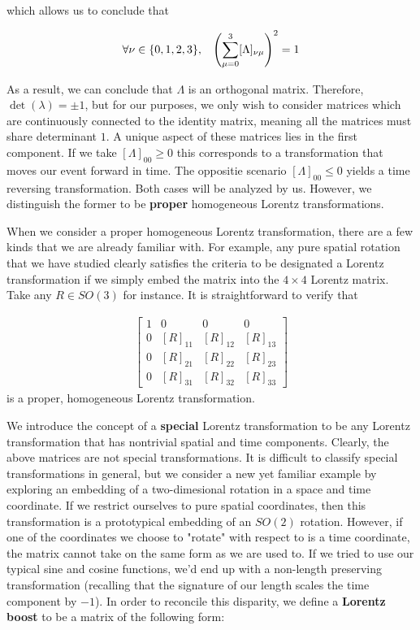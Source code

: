 \documentclass[10pt]{ucthesis}
\begin{document}
which allows us to conclude that 

\begin{equation}
\begin{aligned}
	\forall \nu \in \{0,1,2,3\},\hspace{3mm} \left(\sum_{\mu=0}^3[\Lambda]_{\nu\mu}\right)^2 = 1
\end{aligned}
\end{equation}

As a result, we can conclude that $\Lambda$ is an orthogonal matrix. Therefore, $\det(\lambda) = \pm 1$, but for our purposes, we only wish to consider matrices which are continuously connected to the identity matrix, meaning all the matrices must share determinant $1$. A unique aspect of these matrices lies in the first component. If we take $[\Lambda]_{00}\geq 0$ this corresponds to a transformation that moves our event forward in time. The oppositie scenario $[\Lambda]_{00}\leq 0$ yields a time reversing transformation. Both cases will be analyzed by us. However, we distinguish the former to be \textbf{proper} homogeneous Lorentz transformations.

When we consider a proper homogeneous Lorentz transformation, there are a few kinds that we are already familiar with. For example, any pure spatial rotation that we have studied clearly satisfies the criteria to be designated a Lorentz transformation if we simply embed the matrix into the $4\times 4$ Lorentz matrix. Take any $R\in SO(3)$ for instance. It is straightforward to verify that 

\begin{equation}
\begin{aligned}
\begin{bmatrix}
	1&0&0&0\\
	0&[R]_{11}&[R]_{12}&[R]_{13}\\
	0&[R]_{21}&[R]_{22}&[R]_{23}\\
	0&[R]_{31}&[R]_{32}&[R]_{33}
\end{bmatrix}
\end{aligned}
\end{equation}
is a proper, homogeneous Lorentz transformation.

We introduce the concept of a \textbf{special} Lorentz transformation to be any Lorentz transformation that has nontrivial spatial and time components. Clearly, the above matrices are not special transformations. It is difficult to classify special transformations in general, but we consider a new yet familiar example by exploring an embedding of a two-dimesional rotation in a space and time coordinate. If we restrict ourselves to pure spatial coordinates, then this transformation is a prototypical embedding of an $SO(2)$ rotation. However, if one of the coordinates we choose to "rotate" with respect to is a time coordinate, the matrix cannot take on the same form as we are used to. If we tried to use our typical sine and cosine functions, we'd end up with a non-length preserving transformation (recalling that the signature of our length scales the time component by $-1$). In order to reconcile this disparity, we define a \textbf{Lorentz boost} to be a matrix of the following form:
\end{document}
